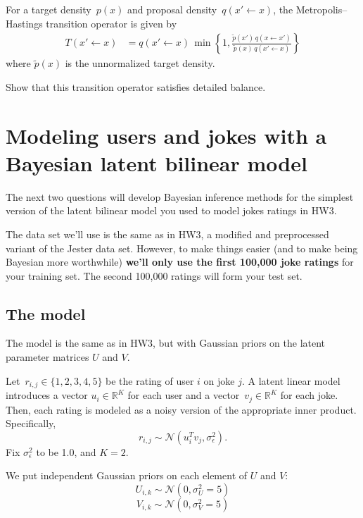 \documentclass{harvardml}
\newcommand{\R}{\mathbb{R}}
\theoremstyle{plain}
\begin{document}
\begin{problem}[10 pts]
  For a target density~$p(x)$ and proposal
  density~$q(x'\gets x)$, the Metropolis--Hastings transition
  operator is given by
  \begin{align*}
    T(x'\gets x) &= q(x'\gets x)\,\min\left\{1,
    \frac{\tilde p(x')\,q(x\gets x')}{\tilde p(x)\,q(x'\gets x)}
    \right\}
  \end{align*}
  where $\tilde p(x)$ is the unnormalized target density.

  Show that this transition operator satisfies detailed balance.
\end{problem}

\newpage

\section*{Modeling users and jokes with a Bayesian latent bilinear model}

The next two questions will develop Bayesian inference methods for the simplest version of the latent bilinear model you used to model jokes ratings in HW3.


The data set we'll use is the same as in HW3, a modified and preprocessed variant of the Jester data set.
However, to make things easier (and to make being Bayesian more worthwhile) {\bf we'll only use the first 100,000 joke ratings} for your training set.  The second 100,000 ratings will form your test set.

\subsection*{The model}

The model is the same as in HW3, but with Gaussian priors on the latent parameter matrices $U$ and $V$.

Let~${r_{i,j}\in\{1,2,3,4,5\}}$ be the rating of user $i$ on joke $j$.  A latent linear model introduces a vector ${u_i\in\R^K}$ for each user and a vector~${v_j\in\R^K}$ for each joke.  Then, each rating is modeled as a noisy version of the appropriate inner product. Specifically,
\[
r_{i,j} \sim \mathcal{N}(u_i^T v_j, \sigma_\epsilon^2).
\]
Fix $\sigma_\epsilon^2$ to be 1.0, and $K = 2$.

We put independent Gaussian priors on each element of $U$ and $V$:
\[U_{i,k} \sim \mathcal{N}(0, \sigma_U^2=5)\]
\[V_{i,k} \sim \mathcal{N}(0, \sigma_V^2=5)\]
\end{document}
